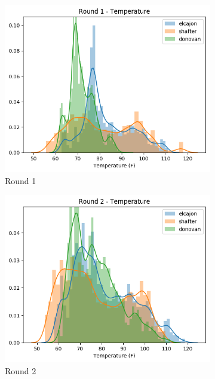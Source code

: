\documentclass{article}
\begin{document}
\begin{figure}
\centering
\begin{subfigure}{0.32\textwidth}
\includegraphics[width=\textwidth]{results/distributions/round1_temperature.png}
\caption{Round 1}
\end{subfigure}
\begin{subfigure}{0.32\textwidth}
\includegraphics[width=\textwidth]{results/distributions/round2_temperature.png}
\caption{Round 2}
\end{subfigure}
\begin{subfigure}{0.32\textwidth}

\end{subfigure}
\end{figure}
\end{document}
